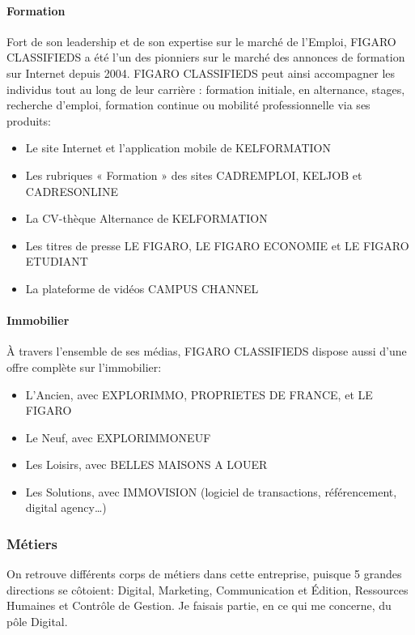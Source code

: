 \paragraph{Formation}
Fort de son leadership et de son expertise sur le marché de l'Emploi, FIGARO CLASSIFIEDS a été l'un des pionniers sur le marché des annonces de formation sur Internet depuis 2004.
FIGARO CLASSIFIEDS peut ainsi accompagner les individus tout au long de leur carrière : formation initiale, en alternance, stages, recherche d'emploi, formation continue ou mobilité professionnelle via ses produits:
\begin{itemize}
  \item Le site Internet et l'application mobile de KELFORMATION
  \item Les rubriques « Formation » des sites CADREMPLOI, KELJOB et CADRESONLINE
  \item La CV-thèque Alternance de KELFORMATION
  \item Les titres de presse LE FIGARO, LE FIGARO ECONOMIE et LE FIGARO ETUDIANT
  \item La plateforme de vidéos CAMPUS CHANNEL
\end{itemize}

\paragraph{Immobilier}
À travers l'ensemble de ses médias, FIGARO CLASSIFIEDS dispose aussi d’une offre complète sur l’immobilier:
\begin{itemize}
  \item L’Ancien, avec EXPLORIMMO, PROPRIETES DE FRANCE, et LE FIGARO
  \item Le Neuf, avec EXPLORIMMONEUF
  \item Les Loisirs, avec BELLES MAISONS A LOUER
  \item Les Solutions, avec IMMOVISION (logiciel de transactions, référencement, digital agency…)
\end{itemize}

\subsubsection{Métiers}

On retrouve différents corps de métiers dans cette entreprise, puisque 5 grandes directions se côtoient:  Digital, Marketing, Communication et Édition, Ressources Humaines et Contrôle de Gestion.
Je faisais partie, en ce qui me concerne, du pôle Digital.

